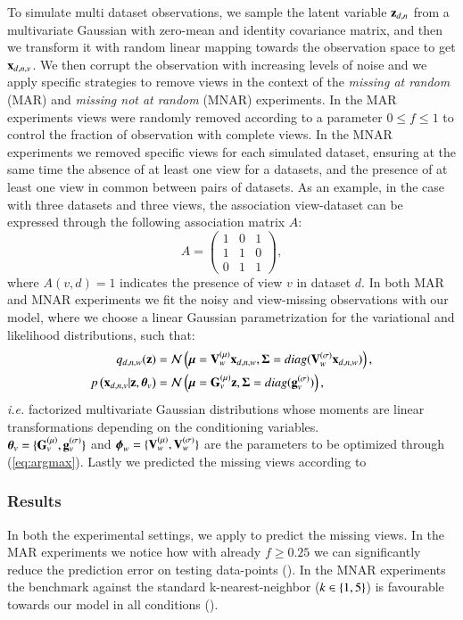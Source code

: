 To simulate multi dataset observations, we sample the latent variable $\mathbf{z}_{d,n}$ from a multivariate Gaussian with zero-mean and identity covariance matrix, and then we transform it with random linear mapping towards the observation space to get $\mathbf{x}_{d,n,v}$.
We then corrupt the observation with increasing levels of noise
and we apply specific strategies to remove views in the context of the \textit{missing at random} (MAR) and \textit{missing not at random} (MNAR) experiments.
In the MAR experiments views were randomly removed according to a parameter $0 \leq f \leq 1$ to control the fraction of observation with complete views.
In the MNAR experiments we removed specific views for each simulated dataset, ensuring at the same time the absence of at least one view for a datasets, and the presence of at least one view in common between pairs of datasets.
As an example, in the case with three datasets and three views, the association view-dataset can be expressed through the following association matrix $A$:
\begin{equation}
A = 
\begin{pmatrix}
1 & 0 & 1 \\
1 & 1 & 0 \\
0 & 1 & 1 
\end{pmatrix},
\end{equation}
where $A(v,d)=1$ indicates the presence of view $v$ in dataset $d$.
In both MAR and MNAR experiments we fit the noisy and view-missing observations with our model, where we choose a linear Gaussian parametrization for the variational and likelihood distributions, such that:
\begin{align}
\label{eq:encoder}
q_{d,n,w}(\mathbf{z}) &= \mathcal{N}\left(\boldsymbol{\mu}=\mathbf{V}_w^{(\mu)} \mathbf{x}_{d,n,w}, \boldsymbol{\Sigma} = diag(\mathbf{V}_w^{(\sigma)} \mathbf{x}_{d,n,w})\right), \\
\label{eq:decoder}
p\left(\mathbf{x}_{d,n,v}|\mathbf{z},\boldsymbol{\theta}_v\right) &= \mathcal{N}\left(\boldsymbol{\mu} = \mathbf{G}_v^{(\mu)} \mathbf{z}, \boldsymbol{\Sigma} = diag(\mathbf{g}_v^{(\sigma)})\right),
\end{align}
\textit{i.e.} factorized multivariate Gaussian distributions whose moments are linear transformations depending on the conditioning variables. \\
$\boldsymbol{\theta}_v = \{\mathbf{G}_v^{(\mu)}, \mathbf{g}_v^{(\sigma)}\}$ and $\boldsymbol{\phi}_w=\{\mathbf{V}_w^{(\mu)}, \mathbf{V}_w^{(\sigma)}\}$ are the parameters to be optimized through (\ref{eq:argmax}).
Lastly we predicted the missing views according to 

\subsubsection{Results}
In both the experimental settings, we apply  to predict the missing views.
In the MAR experiments we notice how with already $f \geq 0.25$ we can significantly reduce the prediction error on testing data-points ().
In the MNAR experiments the benchmark against the standard k-nearest-neighbor ($k \in \left\{1,5\right\}$) is favourable towards our model in all conditions ().


